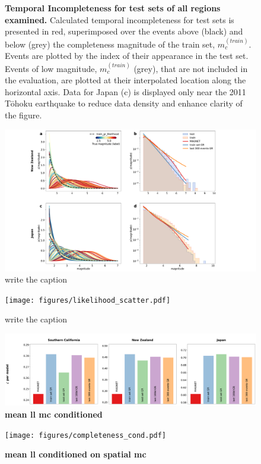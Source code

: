 \documentclass[pdflatex]{sn-jnl}
\begin{document}
\newpage
\begin{figure}[h!]
    \centering
    \caption{
    \textbf{Temporal Incompleteness for test sets of all regions examined.} Calculated temporal incompleteness for test sets is presented in red, superimposed over the events above (black) and below (grey) the completeness magnitude of the train set, $m_c^{(train)}$. Events are plotted by the index of their appearance in the test set. Events of low magnitude, $m_c^{(train)}$ (grey), that are not included in the evaluation, are plotted at their interpolated location along the horizontal axis. Data for Japan (c) is displayed only near the 2011 Tōhoku earthquake to reduce data density and enhance clarity of the figure.
    }
    \label{fig:temp_incompleteness}
\end{figure}

\newpage
\begin{figure}[h!]
    \centering
    \includegraphics[width=1\textwidth]{figures/raw_results_em.pdf}
    \caption{
        write the caption
    }
    \label{fig:model_output_em}
\end{figure}

\newpage
\begin{figure}[h!]
    \centering
    \texttt{[image: figures/likelihood\_scatter.pdf]}
    \caption{
        write the caption
    }
    \label{fig:labels_likelihood}
\end{figure}

\newpage
\begin{figure}[h!]
    \centering
    \includegraphics[width=1\textwidth]{figures/combined_barplots_conditioned.pdf}
    \caption{
        \textbf{mean ll mc conditioned}
    }
    \label{fig:mean_ll_mc_conditioned}
\end{figure}


\newpage
\begin{figure}[h!]
    \centering
    \texttt{[image: figures/completeness\_cond.pdf]}
    \caption{
        \textbf{mean ll conditioned on spatial mc}
    }
    \label{fig:mean_ll_conditioned_spatial_mc}
\end{figure}
\end{document}
